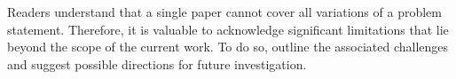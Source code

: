 


\noindent
Readers understand that a single paper cannot cover all variations of a problem statement.
Therefore, it is valuable to acknowledge significant limitations that lie beyond the scope of the current work.
To do so, outline the associated challenges and suggest possible directions for future investigation.
